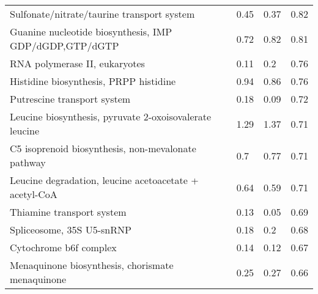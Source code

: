 \begin{sidewaystable}
\begin{center}
\begin{tabularx}{\textwidth}{Xlll}
Sulfonate/nitrate/taurine transport system & 0.45 & 0.37 & 0.82\\
Guanine nucleotide biosynthesis, IMP \textrightarrow{} GDP/dGDP,GTP/dGTP & 0.72 & 0.82 & 0.81\\
RNA polymerase II, eukaryotes & 0.11 & 0.2 & 0.76\\
Histidine biosynthesis, PRPP \textrightarrow{} histidine & 0.94 & 0.86 & 0.76\\
Putrescine transport system & 0.18 & 0.09 & 0.72\\
Leucine biosynthesis, pyruvate \textrightarrow{} 2-oxoisovalerate \textrightarrow{} leucine & 1.29 & 1.37 & 0.71\\
C5 isoprenoid biosynthesis, non-mevalonate pathway & 0.7 & 0.77 & 0.71\\
Leucine degradation, leucine \textrightarrow{} acetoacetate + acetyl-CoA & 0.64 & 0.59 & 0.71\\
Thiamine transport system & 0.13 & 0.05 & 0.69\\
Spliceosome, 35S U5-snRNP & 0.18 & 0.2 & 0.68\\
Cytochrome b6f complex & 0.14 & 0.12 & 0.67\\
Menaquinone biosynthesis, chorismate \textrightarrow{} menaquinone & 0.25 & 0.27 & 0.66\\
\bottomrule
\end{tabularx}
\end{center}
\end{sidewaystable}
